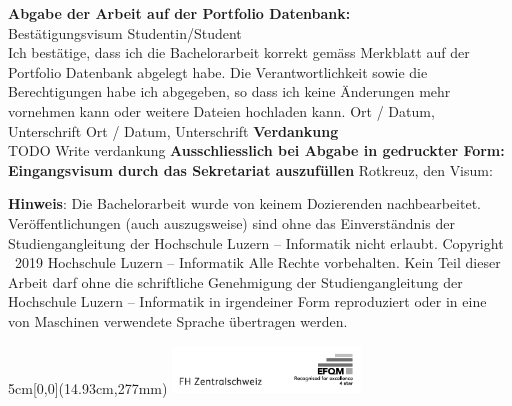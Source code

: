 \newpage
\noindent
\textbf{Abgabe der Arbeit auf der Portfolio Datenbank:}\\
Best\"atigungsvisum Studentin/Student\\
Ich best\"atige, dass ich die Bachelorarbeit korrekt gem\"ass Merkblatt auf der Portfolio Datenbank abgelegt habe. Die Verantwortlichkeit sowie die Berechtigungen habe ich abgegeben, so dass ich keine \"Anderungen mehr vornehmen kann oder weitere Dateien hochladen kann. \newline \newline
Ort / Datum, Unterschrift       \underline{\hspace*{4cm}} \newline \newline
Ort / Datum, Unterschrift   \underline{\hspace*{4cm}} \newline \newline \newline
\textbf{Verdankung}\\
{\color{red}TODO Write verdankung} \newline \newline \newline
\noindent
{\textbf{Ausschliesslich bei Abgabe in gedruckter Form: \\
Eingangsvisum durch das Sekretariat auszuf\"ullen}} \newline \newline
Rotkreuz, den   \underline{\hspace*{4cm}} \hspace*{1cm} Visum:  \underline{\hspace*{4cm}} \vspace*{10cm}


\noindent
{\textbf{Hinweis}}: Die Bachelorarbeit wurde von keinem Dozierenden nachbearbeitet. Ver\"offentlichungen (auch auszugsweise) sind ohne das Einverst\"andnis der Studiengangleitung der Hochschule Luzern -- Informatik nicht erlaubt. \newline \newline
Copyright \textcopyright\ {\color{red}2019} Hochschule Luzern -- Informatik \newline \newline
Alle Rechte vorbehalten. Kein Teil dieser Arbeit darf ohne die schriftliche Genehmigung der Studiengangleitung der Hochschule Luzern -- Informatik in irgendeiner Form reproduziert oder in eine von Maschinen verwendete Sprache \"ubertragen werden.

\begin{textblock*}{5cm}[0,0](14.93cm,277mm)
	\includegraphics[keepaspectratio,width=5cm]{img/FHZ_Logo}
\end{textblock*}

\newpage
{}

